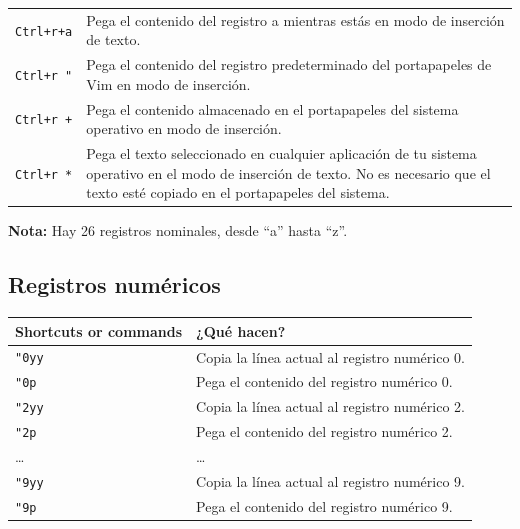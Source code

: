 \documentclass[
  doc,
  floatsintext,
  longtable,
  a4paper,
  nolmodern,
  notxfonts,
  notimes,
  12pt,
  colorlinks=true,linkcolor=blue,citecolor=blue,urlcolor=blue]{apa7}
\newcounter{none} %
\begin{document}
{\begin{longtable}[]{@{}
  >{\raggedright\arraybackslash}p{}
  >{\raggedright\arraybackslash}p{}@{}}
\texttt{Ctrl+r+a} & Pega el contenido del registro a mientras estás en
modo de inserción de texto. \\
\texttt{Ctrl+r\ "} & Pega el contenido del registro predeterminado del
portapapeles de Vim en modo de inserción. \\
\texttt{Ctrl+r\ +} & Pega el contenido almacenado en el portapapeles del
sistema operativo en modo de inserción. \\
\texttt{Ctrl+r\ *} & Pega el texto seleccionado en cualquier aplicación
de tu sistema operativo en el modo de inserción de texto. No es
necesario que el texto esté copiado en el portapapeles del sistema. \\
\end{longtable}
}

\textbf{Nota:} Hay 26 registros nominales, desde ``a'' hasta ``z''.

\subsection{Registros numéricos}\label{registros-numuxe9ricos}

{\def\LTcaptype{none} %
\begin{longtable}[]{@{}
  >{\raggedright\arraybackslash}p{}
  >{\raggedright\arraybackslash}p{}@{}}
\toprule\noalign{}
\begin{minipage}[b]{\linewidth}\raggedright
Shortcuts or commands
\end{minipage} & \begin{minipage}[b]{\linewidth}\raggedright
¿Qué hacen?
\end{minipage} \\
\midrule\noalign{}
\endhead
\bottomrule\noalign{}
\endlastfoot
\texttt{"0yy} & Copia la línea actual al registro numérico 0. \\
\texttt{"0p} & Pega el contenido del registro numérico 0. \\
\texttt{"2yy} & Copia la línea actual al registro numérico 2. \\
\texttt{"2p} & Pega el contenido del registro numérico 2. \\
\ldots{} & \ldots{} \\
\texttt{"9yy} & Copia la línea actual al registro numérico 9. \\
\texttt{"9p} & Pega el contenido del registro numérico 9. \\
\end{longtable}
}
\end{document}
